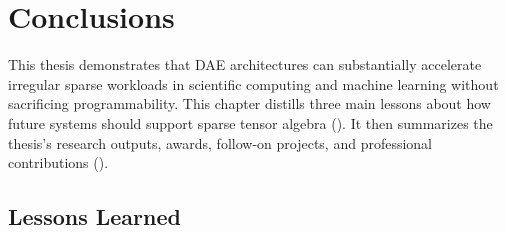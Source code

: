 \chapter{Conclusions} \label{sec:conclusions}

This thesis demonstrates that DAE architectures can substantially accelerate irregular sparse workloads in scientific computing and machine learning without sacrificing programmability. This chapter distills three main lessons about how future systems should support sparse tensor algebra (). It then summarizes the thesis's research outputs, awards, follow-on projects, and professional contributions ().

\section{Lessons Learned} \label{sec:conclusions-lessons-learned}

